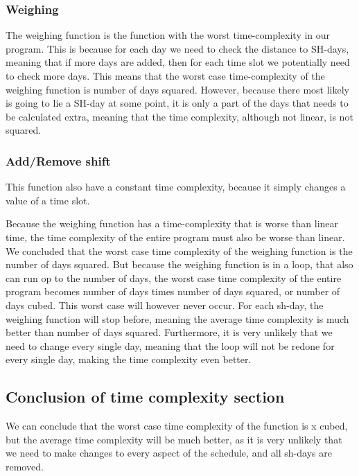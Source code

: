 \subsubsection{Weighing}
The weighing function is the function with the worst time-complexity in our program. This is because for each day we need to check the distance to SH-days, meaning that if more days are added, then for each time slot we potentially need to check more days. This means that the worst case time-complexity of the weighing function is number of days squared. However, because there most likely is going to lie a SH-day at some point, it is only a part of the days that needs to be calculated extra, meaning that the time complexity, although not linear, is not squared.

\subsubsection{Add/Remove shift}
This function also have a constant time complexity, because it simply changes a value of a time slot.


Because the weighing function has a time-complexity that is worse than linear time, the time complexity of the entire program must also be worse than linear. We concluded that the worst case time complexity of the weighing function is the number of days squared. But because the weighing function is in a loop, that also can run op to the number of days, the worst case time complexity of the entire program becomes number of days times number of days squared, or number of days cubed. This worst case will however never occur. For each sh-day, the weighing function will stop before, meaning the average time complexity is much better than number of days squared. Furthermore, it is very unlikely that we need to change every single day, meaning that the loop will not be redone for every single day, making the time complexity even better.

\subsection{Conclusion of time complexity section}
We can conclude that the worst case time complexity of the function is x cubed, but the average time complexity will be much better, as it is very unlikely that we need to make changes to every aspect of the schedule, and all sh-days are removed.


